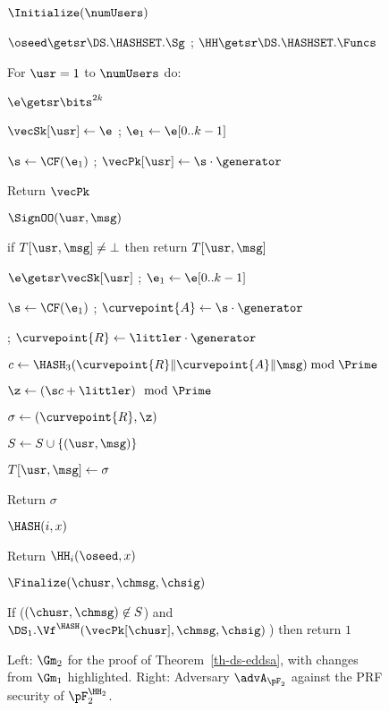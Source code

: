 \begin{figure}
{		\begin{oracle}{$\Initialize(\numUsers)$}
			\item $\oseed\getsr\DS.\HASHSET.\Sg$ ; 
				$\HH \getsr \DS.\HASHSET.\Funcs$
			\item For $\usr=1$ to $\numUsers$ do:
			\item \quad $\e\getsr \bits^{2k}$ 
			\item \quad $\vecSk[\usr] \gets \e$
				; $\e_1 \gets \e[0..k-1]$ 
			\item \quad $\s \gets \CF(\e_1)$ ; $\vecPk[\usr] \gets \s\cdot \generator$
			\item Return $\vecPk$
	\end{oracle}
		\ExptSepSpace
		
		\begin{oracle}{$\SignOO(\usr, \msg)$}
			\item if $T[\usr, \msg] \neq \bot$ then return $T[\usr, \msg]$
			\item $\e\getsr \vecSk[\usr]$ ; $\e_1 \gets \e[0..k-1]$
			\item $\s \gets \CF(\e_1)$ ; $\curvepoint{A} \gets \s\cdot \generator$
			\item \gamechange{$\littler \getsr \FnO(\usr, \msg) \bmod \Prime$}
			; $\curvepoint{R} \gets \littler\cdot \generator$
			\item $c \gets \HASH_3(\curvepoint{R}\|\curvepoint{A}\|\msg) \bmod \Prime$
			\item $\z \gets (\s c + \littler) \mod \Prime$
			\item $\sigma \gets (\curvepoint{R},\z)$
			\item $S \gets S \cup \{(\usr, \msg)\}$
			\item $T[\usr, \msg] \gets \sigma$
			\item Return $\sigma$
		\end{oracle}
		\ExptSepSpace
		
		\begin{oracle}{$\HASH(i,x)$}
			\item Return $\HH_i(\oseed,x)$
		\end{oracle}
		\ExptSepSpace
		
		\begin{oracle}{$\Finalize(\chusr, \chmsg, \chsig)$}
			\item If ($(\chusr,\chmsg) \not\in S$) and $\DS_1.\Vf^{\HASH}(\vecPk[\chusr], \chmsg, \chsig)\:$) then return $1$ \vspace{2pt}
		\end{oracle}
	}
	\vspace{-5pt}
	\caption{Left: $\Gm_2$ for the proof of Theorem~\ref{th-ds-eddsa}, with changes from $\Gm_1$ highlighted. Right: Adversary $\advA_{\pF_2}$ against the PRF security of $\pF_2^{\HH_2}$.}
	\label{fig:gm2}
	\hrulefill
	\vspace{-10pt}
\end{figure}



